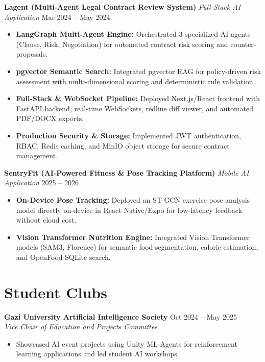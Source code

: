 \documentclass[10pt, a4paper]{article}
\begin{document}
\vspace{0.12cm}

\textbf{Lagent (Multi-Agent Legal Contract Review System)} \hfill \textit{Full-Stack AI Application} \hfill Mar 2024 -- May 2024
\begin{itemize}
    \item \textbf{LangGraph Multi-Agent Engine:} Orchestrated 3 specialized AI agents (Clause, Risk, Negotiation) for automated contract risk scoring and counter-proposals.
    \item \textbf{pgvector Semantic Search:} Integrated pgvector RAG for policy-driven risk assessment with multi-dimensional scoring and deterministic rule validation.
    \item \textbf{Full-Stack \& WebSocket Pipeline:} Deployed Next.js/React frontend with FastAPI backend, real-time WebSockets, redline diff viewer, and automated PDF/DOCX exports.
    \item \textbf{Production Security \& Storage:} Implemented JWT authentication, RBAC, Redis caching, and MinIO object storage for secure contract management.
\end{itemize}

\vspace{0.12cm}

\textbf{SentryFit (AI-Powered Fitness \& Pose Tracking Platform)} \hfill \textit{Mobile AI Application} \hfill 2025 -- 2026
\begin{itemize}
    \item \textbf{On-Device Pose Tracking:} Deployed an ST-GCN exercise pose analysis model directly on-device in React Native/Expo for low-latency feedback without cloud cost.
    \item \textbf{Vision Transformer Nutrition Engine:} Integrated Vision Transformer models (SAM3, Florence) for semantic food segmentation, calorie estimation, and OpenFood SQLite search.
\end{itemize}

\section{Student Clubs}
\textbf{Gazi University Artificial Intelligence Society} \hfill Oct 2024 -- May 2025\\
\textit{Vice Chair of Education and Projects Committee}
\begin{itemize}
    \item Showcased AI event projects using Unity ML-Agents for reinforcement learning applications and led student AI workshops.
\end{itemize}
\end{document}
